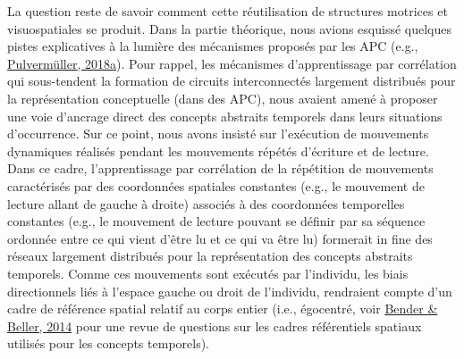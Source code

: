 \documentclass[
  a4paper,12pt,twoside,onecolumn,openright,final,oldfontcommands]{memoir}
\begin{document}
La question reste de savoir comment cette réutilisation de structures motrices et visuospatiales se produit. Dans la partie théorique, nous avions esquissé quelques pistes explicatives à la lumière des mécanismes proposés par les APC (e.g., \protect\hyperlink{ref-pulvermuller_neural_2018}{Pulvermüller, 2018a}). Pour rappel, les mécanismes d'apprentissage par corrélation qui sous-tendent la formation de circuits interconnectés largement distribués pour la représentation conceptuelle (dans des APC), nous avaient amené à proposer une voie d'ancrage direct des concepts abstraits temporels dans leurs situations d'occurrence. Sur ce point, nous avons insisté sur l'exécution de mouvements dynamiques réalisés pendant les mouvements répétés d'écriture et de lecture. Dans ce cadre, l'apprentissage par corrélation de la répétition de mouvements caractérisés par des coordonnées spatiales constantes (e.g., le mouvement de lecture allant de gauche à droite) associés à des coordonnées temporelles constantes (e.g., le mouvement de lecture pouvant se définir par sa séquence ordonnée entre ce qui vient d'être lu et ce qui va être lu) formerait in fine des réseaux largement distribués pour la représentation des concepts abstraits temporels. Comme ces mouvements sont exécutés par l'individu, les biais directionnels liés à l'espace gauche ou droit de l'individu, rendraient compte d'un cadre de référence spatial relatif au corps entier (i.e., égocentré, voir \protect\hyperlink{ref-bender_mapping_2014}{Bender \& Beller, 2014} pour une revue de questions sur les cadres référentiels spatiaux utilisés pour les concepts temporels).
\end{document}

